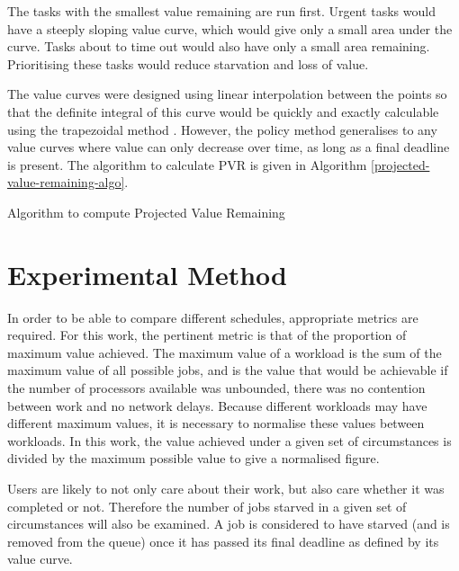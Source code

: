 \documentclass[english,british]{IEEEtran}
\begin{document}
The tasks with the smallest value remaining are run first. Urgent
tasks would have a steeply sloping value curve, which would give only
a small area under the curve. Tasks about to time out would also have
only a small area remaining. Prioritising these tasks would reduce
starvation and loss of value.

The value curves were designed using linear interpolation between
the points so that the definite integral of this curve would be quickly
and exactly calculable using the trapezoidal method \cite{alvarado79}.
However, the policy method generalises to any value curves where value
can only decrease over time, as long as a final deadline is present.
The algorithm to calculate PVR is given in Algorithm \ref{projected-value-remaining-algo}.

\begin{algorithm}





\protect\caption{Algorithm to compute Projected Value Remaining }


\label{projected-value-remaining-algo}
\end{algorithm}



\section{Experimental Method}

In order to be able to compare different schedules, appropriate metrics
are required. For this work, the pertinent metric is that of the proportion
of maximum value achieved. The maximum value of a workload is the
sum of the maximum value of all possible jobs, and is the value that
would be achievable if the number of processors available was unbounded,
there was no contention between work and no network delays. Because
different workloads may have different maximum values, it is necessary
to normalise these values between workloads. In this work, the value
achieved under a given set of circumstances is divided by the maximum
possible value to give a normalised figure.

Users are likely to not only care about their work, but also care
whether it was completed or not. Therefore the number of jobs starved
in a given set of circumstances will also be examined. A job is considered
to have starved (and is removed from the queue) once it has passed
its final deadline  as defined by its value curve.
\end{document}
